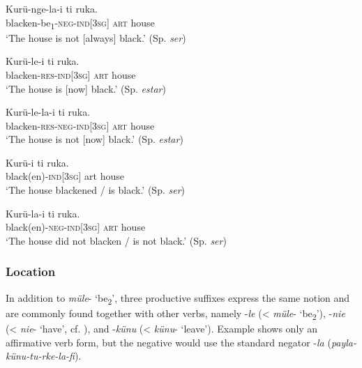 \documentclass[output=paper,colorlinks,citecolor=brown,draft]{langscibook}
\begin{document}
    \label{ex:mapu:7a'}
        \gll Kurü-nge-la-i ti ruka. \\
             blacken-be\textsubscript{1}{}-\textsc{neg-ind[3sg]} \textsc{art} house \\
        \glt ‘The house is not [always] black.’ (Sp. \textit{ser})
    
    \ex\label{ex:mapu:7b}
        \gll Kurü-le-i ti ruka. \\ 
             blacken-\textsc{res-ind[3sg]} \textsc{art} house \\
        \glt ‘The house is [now] black.’ (Sp. \textit{estar})
    
    \label{ex:mapu:7b'}
        \gll Kurü-le-la-i ti ruka. \\
             blacken-\textsc{res-neg-ind[3sg]} \textsc{art} house \\
        \glt ‘The house is not [now] black.’ (Sp. \textit{estar})
        
    \ex\label{ex:mapu:7c}
        \gll Kurü-i ti ruka. \\ 
             black(en)\textsc{{}-ind[3sg]} art house \\
        \glt ‘The house blackened / is black.’ (Sp. \textit{ser})
    
    \label{ex:mapu:7c'}
        \gll Kurü-la-i ti ruka. \\
             black(en)-\textsc{neg-ind[3sg]} \textsc{art} house \\
        \glt ‘The house did not blacken / is not black.’ (Sp. \textit{ser}) 
    \z
\z 


\subsubsection{Location}

In addition to \textit{müle}{}- ‘be\textsubscript{2}’, three productive suffixes express the same notion and are commonly found together with other verbs, namely \nobreakdash-\textit{le} (< \textit{müle}{}- ‘be\textsubscript{2}’), \nobreakdash-\textit{nie} (< \textit{nie}{}- ‘have’, cf. ), and \nobreakdash-\textit{künu} (< \textit{künu}{}- ‘leave’). Example  shows only an affirmative verb form, but the negative would use the standard negator -\textit{la} (\textit{payla-künu-tu-rke-la-fi}).
\end{document}
